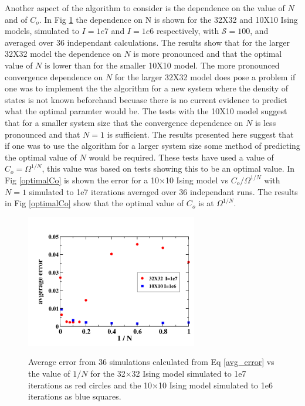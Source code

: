 \documentclass[aps,prl,reprint,superscriptaddress,showkeys]{revtex4-1}
\begin{document}
Another aspect of the algorithm to consider is the dependence on the value of $N$ and of $C_{o}$. In Fig \ref{N_dependence} the dependence on N is shown for  the 32X32  and  10X10 Ising models, simulated to $I=1e7$ and $I=1e6$ respectively, with $\mathcal{S}=100$, and averaged over 36 independant calculations. The results show that for the larger 32X32 model the dependence on $N$ is more pronounced and that the optimal value of $N$ is lower than for the smaller 10X10 model. The more pronounced convergence dependence on $N$ for the larger 32X32 model does pose a problem if one was to implement the the algorithm for a new system where the density of states is not known beforehand becuase there is no current evidence to predict what the optimal paramter would be.  The tests with the 10X10 model suggest that for a smaller system size that the convergence dependence on $N$ is less pronounced and that $N=1$ is sufficient. The results presented here suggest that if one was to use the algorithm for a larger system size some method of predicting the optimal value of $N$ would be required. These tests have used a value of $C_{o}=\Omega^{1/N}$, this value was based on tests showing this to be an optimal value. In Fig \ref{optimalCo}   is shown the error for a 10$\times$10 Ising model vs $C_{o}/\Omega^{1/N}$ with $N=1$ simulated to 1e7 iterations averaged over 36 independant runs. The results in Fig \ref{optimalCo}  show that the optimal value of $C_{o}$ is at $\Omega^{1/N}$. 

\begin{figure}[h!]
\includegraphics[width=7.5cm]{./figures/randN_3232_1010_S100.png}\\
\caption{ Average error from 36 simulations calculated from Eq \ref{avg_error} vs the value of $1/N$ for the 32$\times$32 Ising model simulated to 1e7 iterations as red circles and the 10$\times$10 Ising model simulated to 1e6 iterations as blue squares.    \label{N_dependence}}
\end{figure}
\end{document}
